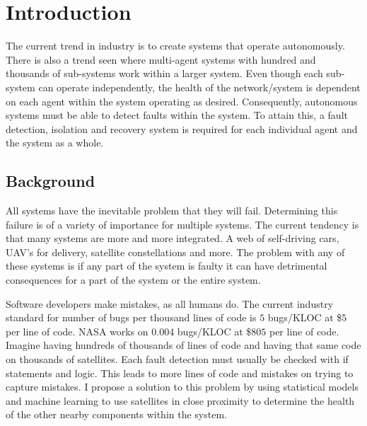 %
%


\chapter{Introduction}
\vspace{-2em}
\minitoc

\startarabicpagenumbering %


The current trend in industry is to create systems that operate autonomously. There is also a trend seen where multi-agent systems with hundred and thousands of sub-systems work within a larger system. Even though each sub-system can operate independently, the health of the network/system is dependent on each agent within the system operating as desired. Consequently, autonomous systems must be able to detect faults within the system. To attain this, a fault detection, isolation and recovery system is required for each individual agent and the system as a whole.

\section{Background}
All systems have the inevitable problem that they will fail. Determining this failure is of a variety of importance for multiple systems. The current tendency is that many systems are more and more integrated. A web of self-driving cars, UAV's for delivery, satellite constellations and more. The problem with any of these systems is if any part of the system is faulty it can have detrimental consequences for a part of the system or the entire system.

Software developers make mistakes, as all humans do. The current industry standard for number of bugs per thousand lines of code is $5$ bugs/KLOC at \$$5$ per line of code. NASA works on 0.004 bugs/KLOC at \$$805$ per line of code. Imagine having hundreds of thousands of lines of code and having that same code on thousands of satellites. Each fault detection must usually be checked with if statements and logic. This leads to more lines of code and mistakes on trying to capture mistakes. I propose a solution to this problem by using statistical models and machine learning to use satellites in close proximity to determine the health of the other nearby components within the system.

